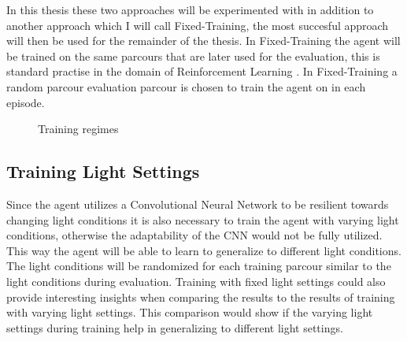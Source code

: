 In this thesis these two approaches will be experimented with in addition to another approach which I will call Fixed-Training, the most succesful approach will then be used for the remainder of the thesis. In Fixed-Training the agent will be trained on the same parcours that are later used for the evaluation, this is standard practise in the domain of Reinforcement Learning \autocite{rlbook2020}. In Fixed-Training a random parcour evaluation parcour is chosen to train the agent on in each episode.

\begin{figure}
     \centering
     \caption{Training regimes} 
     \label{fig:training_regimes}
\end{figure}



\subsection*{Training Light Settings}
Since the agent utilizes a Convolutional Neural Network to be resilient towards changing light conditions it is also necessary to train the agent with varying light conditions, otherwise the adaptability of the CNN would not be fully utilized. This way the agent will be able to learn to generalize to different light conditions. The light conditions will be randomized for each training parcour similar to the light conditions during evaluation.
Training with fixed light settings could also provide interesting insights when comparing the results to the results of training with varying light settings. This comparison would show if the varying light settings during training help in generalizing to different light settings.

